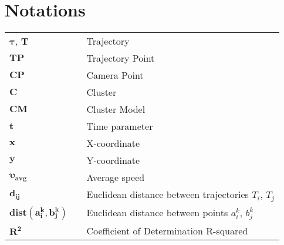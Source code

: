 \section*{Notations}
\label{ch:Notations}

\begin{tabular}{lll}
	\\
	$\bm{\tau}$, $\bm{T}$       	& & {Trajectory} \\[0.5ex]
	$\bm{TP}$        				& & {Trajectory Point} \\[0.5ex]
	$\bm{CP}$        				& & {Camera Point} \\[0.5ex]
	$\bm{C}$        				& & {Cluster} \\[0.5ex]
	$\bm{CM}$        				& & {Cluster Model} \\[0.5ex]
	$\bm{t}$						& & {Time parameter} \\[0.5ex]
	$\bm{x}$						& & {X-coordinate} \\[0.5ex]
	$\bm{y}$						& & {Y-coordinate} \\[0.5ex]
	$\bm{\upsilon_{avg}}$			& & {Average speed} \\[0.5ex]
	$\bm{d_{ij}}$					& & {Euclidean distance between trajectories $T_i$, $T_j$} \\[0.5ex]
	$\bm{dist(a_i^k, b_j^k)}$		& & {Euclidean distance between points $a_i^k$, $b_j^k$} \\[0.5ex]
	$\bm{R^2}$						& & {Coefficient of Determination R-squared} \\[0.5ex]
	
\end{tabular}
